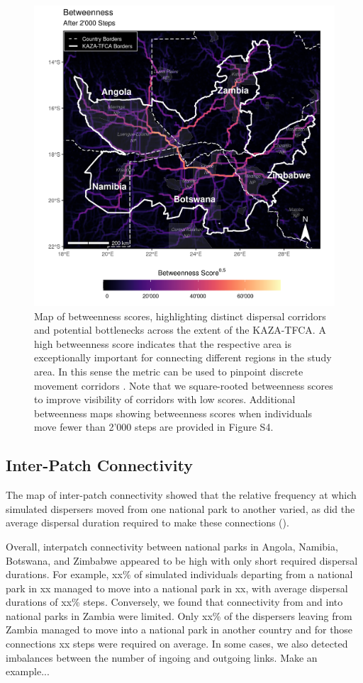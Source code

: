 \documentclass[abstract=on,10pt,a4paper,bibliography=totocnumbered]{article}
\begin{document}
\begin{figure}
  \includegraphics[width=\textwidth]{99_Betweenness.png}
  \caption{Map of betweenness scores, highlighting distinct dispersal corridors
  and potential bottlenecks across the extent of the KAZA-TFCA. A high
  betweenness score indicates that the respective area is exceptionally
  important for connecting different regions in the study area. In this sense
  the metric can be used to pinpoint discrete movement corridors
  \citep{BastilleRousseau.2018}. Note that we square-rooted betweenness scores
  to improve visibility of corridors with low scores. Additional betweenness
  maps showing betweenness scores when individuals move fewer than 2'000 steps
  are provided in Figure S4.}
  \label{Betweenness}
\end{figure}

\subsection{Inter-Patch Connectivity}
The map of inter-patch connectivity showed that the relative frequency at which
simulated dispersers moved from one national park to another varied, as did the
average dispersal duration required to make these connections
().


Overall, interpatch connectivity between national parks in Angola, Namibia,
Botswana, and Zimbabwe appeared to be high with only short required dispersal
durations. For example, xx\% of simulated individuals departing from a national
park in xx managed to move into a national park in xx, with average dispersal
durations of xx\% steps. Conversely, we found that connectivity from and into
national parks in Zambia were limited. Only xx\% of the dispersers leaving from
Zambia managed to move into a national park in another country and for those
connections xx steps were required on average. In some cases, we also detected
imbalances between the number of ingoing and outgoing links. Make an example...
\end{document}
